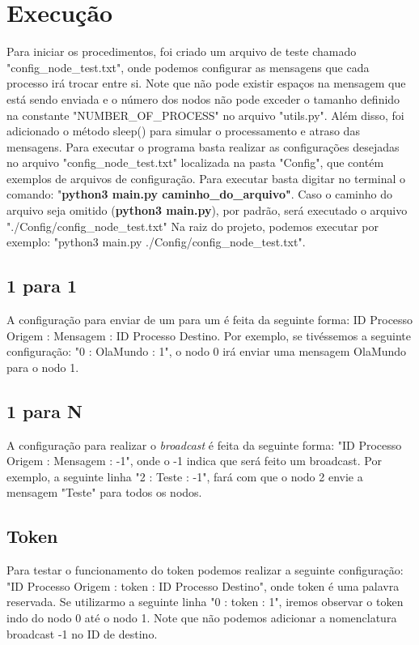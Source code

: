 \documentclass[
	12pt,				%
	openright,			%
	oneside,			%
	a4paper,			%
	english,			%
	french,				%
	spanish,			%
	brazil				%
	]{abntex2}
\begin{document}
\section{Execução}
Para iniciar os procedimentos, foi criado um arquivo de teste chamado "config\_node\_test.txt",
onde podemos configurar as mensagens que cada processo irá trocar entre si.
Note que não pode existir espaços na mensagem que está sendo enviada
e o número dos nodos não pode exceder o tamanho definido na constante
"NUMBER\_OF\_PROCESS" no arquivo "utils.py". Além disso, foi adicionado
o método sleep() para simular o processamento e atraso das mensagens.
Para executar o programa basta realizar as configurações desejadas no arquivo
"config\_node\_test.txt" localizada na pasta "Config", que contém exemplos 
de arquivos de configuração. Para executar basta digitar no terminal o comando: "\textbf{python3 main.py caminho\_do\_arquivo"}.
Caso o caminho do arquivo seja omitido (\textbf{python3 main.py}), por padrão, será executado o arquivo "./Config/config\_node\_test.txt"
Na raiz do projeto, podemos executar por exemplo: "python3 main.py ./Config/config\_node\_test.txt".


\subsection{1 para 1}
A configuração para enviar de um para um é feita da seguinte forma: ID Processo Origem : Mensagem : ID Processo Destino.
Por exemplo, se tivéssemos a seguinte configuração: "0 : OlaMundo : 1", o nodo
0 irá enviar uma mensagem OlaMundo para o nodo 1. 

\subsection{1 para N}
A configuração para realizar o \emph{broadcast} é feita da seguinte forma:
"ID Processo Origem : Mensagem : -1", onde o -1 indica que será feito um broadcast.
Por exemplo, a seguinte linha "2 : Teste : -1", fará com que o nodo 2 envie a mensagem "Teste" para
todos os nodos.

\subsection{Token}
Para testar o funcionamento do token podemos realizar a seguinte configuração:
"ID Processo Origem : token : ID Processo Destino", onde token é uma palavra reservada.
Se utilizarmo a seguinte linha "0 : token : 1", iremos observar o token indo do nodo 0
até o nodo 1. Note que não podemos adicionar a nomenclatura broadcast -1 no ID de destino.
\end{document}
